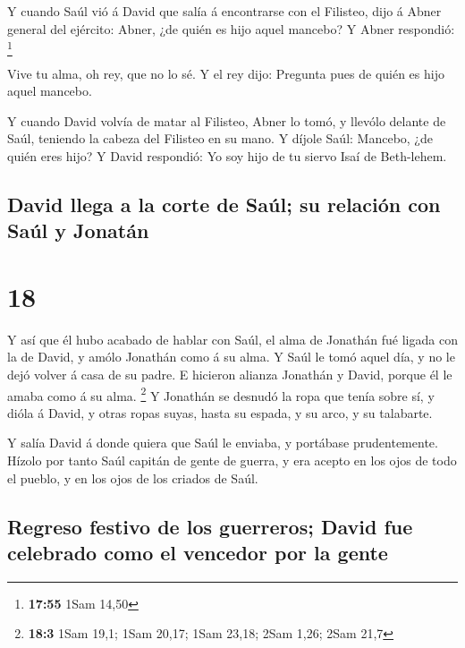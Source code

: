 Y cuando Saúl vió á David que salía á encontrarse con el
Filisteo, dijo á Abner general del ejército: Abner, ¿de quién es hijo
aquel mancebo? Y Abner respondió: \footnote{\textbf{17:55} 1Sam 14,50}

 Vive tu alma, oh rey, que no lo sé. Y el rey dijo:
Pregunta pues de quién es hijo aquel mancebo.

 Y cuando David volvía de matar al Filisteo, Abner lo
tomó, y llevólo delante de Saúl, teniendo la cabeza del Filisteo en su
mano.  Y díjole Saúl: Mancebo, ¿de quién eres hijo? Y
David respondió: Yo soy hijo de tu siervo Isaí de Beth-lehem.

\hypertarget{david-llega-a-la-corte-de-sauxfal-su-relaciuxf3n-con-sauxfal-y-jonatuxe1n}{%
\subsection{David llega a la corte de Saúl; su relación con Saúl y
Jonatán}\label{david-llega-a-la-corte-de-sauxfal-su-relaciuxf3n-con-sauxfal-y-jonatuxe1n}}

\hypertarget{section-17}{%
\section{18}\label{section-17}}

 Y así que él hubo acabado de hablar con Saúl, el alma de
Jonathán fué ligada con la de David, y amólo Jonathán como á su alma.
 Y Saúl le tomó aquel día, y no le dejó volver á casa de
su padre.  E hicieron alianza Jonathán y David, porque él
le amaba como á su alma. \footnote{\textbf{18:3} 1Sam 19,1; 1Sam 20,17;
  1Sam 23,18; 2Sam 1,26; 2Sam 21,7}  Y Jonathán se desnudó
la ropa que tenía sobre sí, y dióla á David, y otras ropas suyas, hasta
su espada, y su arco, y su talabarte.

 Y salía David á donde quiera que Saúl le enviaba, y
portábase prudentemente. Hízolo por tanto Saúl capitán de gente de
guerra, y era acepto en los ojos de todo el pueblo, y en los ojos de los
criados de Saúl.

\hypertarget{regreso-festivo-de-los-guerreros-david-fue-celebrado-como-el-vencedor-por-la-gente}{%
\subsection{Regreso festivo de los guerreros; David fue celebrado como
el vencedor por la
gente}\label{regreso-festivo-de-los-guerreros-david-fue-celebrado-como-el-vencedor-por-la-gente}}

